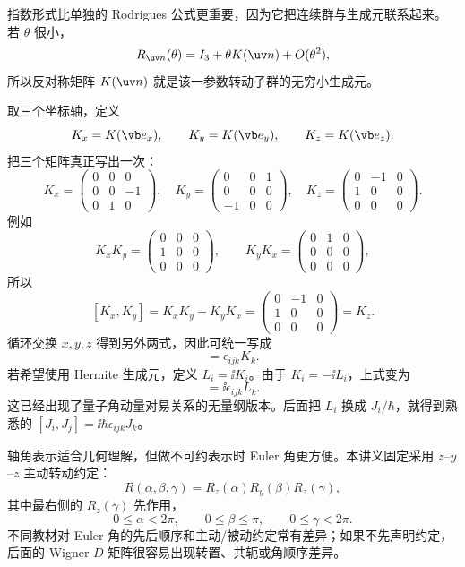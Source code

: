 指数形式比单独的 Rodrigues 公式更重要，因为它把连续群与生成元联系起来。若 $\theta$ 很小，
\[
R_{\uv n}(\theta)
=I_3+\theta K(\uv n)+O(\theta^2),
\]
所以反对称矩阵 $K(\uv n)$ 就是该一参数转动子群的无穷小生成元。

取三个坐标轴，定义
\[
K_x=K(\vb e_x),\qquad
K_y=K(\vb e_y),\qquad
K_z=K(\vb e_z).
\]
把三个矩阵真正写出一次：
\[
K_x=\begin{pmatrix}0&0&0\\0&0&-1\\0&1&0\end{pmatrix},\quad
K_y=\begin{pmatrix}0&0&1\\0&0&0\\-1&0&0\end{pmatrix},\quad
K_z=\begin{pmatrix}0&-1&0\\1&0&0\\0&0&0\end{pmatrix}.
\]
例如
\[
K_xK_y=
\begin{pmatrix}0&0&0\\1&0&0\\0&0&0\end{pmatrix},
\qquad
K_yK_x=
\begin{pmatrix}0&1&0\\0&0&0\\0&0&0\end{pmatrix},
\]
所以
\[
[K_x,K_y]=K_xK_y-K_yK_x
=\begin{pmatrix}0&-1&0\\1&0&0\\0&0&0\end{pmatrix}=K_z.
\]
循环交换 $x,y,z$ 得到另外两式，因此可统一写成
\begin{equation}
[K_i,K_j]=\epsilon_{ijk}K_k.
\label{eq:so3-lie-algebra-real}
\end{equation}
若希望使用 Hermite 生成元，定义 $L_i=\ii K_i$。由于 $K_i=-\ii L_i$，上式变为
\begin{equation}
[L_i,L_j]=\ii\epsilon_{ijk}L_k.
\label{eq:so3-lie-algebra-hermitian}
\end{equation}
这已经出现了量子角动量对易关系的无量纲版本。后面把 $L_i$ 换成 $J_i/\hbar$，就得到熟悉的
$[J_i,J_j]=\ii\hbar\epsilon_{ijk}J_k$。

轴角表示适合几何理解，但做不可约表示时 Euler 角更方便。本讲义固定采用 $z$--$y$--$z$ 主动转动约定：
\begin{equation}
R(\alpha,\beta,\gamma)
=R_z(\alpha)R_y(\beta)R_z(\gamma),
\label{eq:zyz-euler}
\end{equation}
其中最右侧的 $R_z(\gamma)$ 先作用，
\[
0\le \alpha<2\pi,
\qquad 0\le\beta\le\pi,
\qquad 0\le\gamma<2\pi.
\]
不同教材对 Euler 角的先后顺序和主动/被动约定常有差异；如果不先声明约定，后面的 Wigner $D$ 矩阵很容易出现转置、共轭或角顺序差异。

